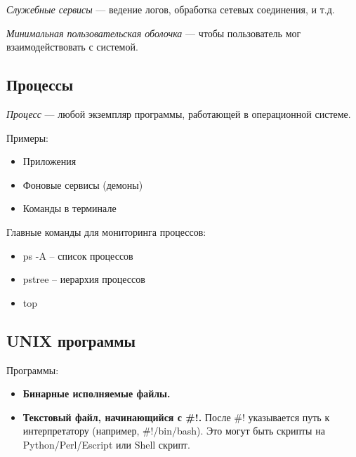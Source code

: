 \begin{multicols}{2}
      \begin{definition}{}{}
      \textit{Служебные сервисы} --- ведение логов, обработка сетевых соединения, и т.д.
      \end{definition}

      \begin{definition}{}{}
      \textit{Минимальная пользовательская оболочка} --- чтобы пользователь мог взаимодействовать с системой.
      \end{definition}

      \subsection*{Процессы}

      \begin{definition}{}{}
      \textit{Процесс} --- любой экземпляр программы, работающей в операционной системе.
      \end{definition}

      Примеры:
      \begin{itemize}
        \item Приложения
        \item Фоновые сервисы (демоны)
        \item Команды в терминале
      \end{itemize}

      Главные команды для мониторинга процессов:
      \begin{itemize}
        \item ps -A -- список процессов
        \item pstree -- иерархия процессов
        \item top
      \end{itemize}

      \subsection*{UNIX программы}

      Программы:
      \begin{itemize}
        \item \textbf{Бинарные исполняемые файлы.}
        \item \textbf{Текстовый файл, начинающийся с \#!.} После \#! указывается путь к интерпретатору (например, \#!/bin/bash). Это могут быть скрипты на Python/Perl/Escript или Shell скрипт.
      \end{itemize}


\end{multicols}
